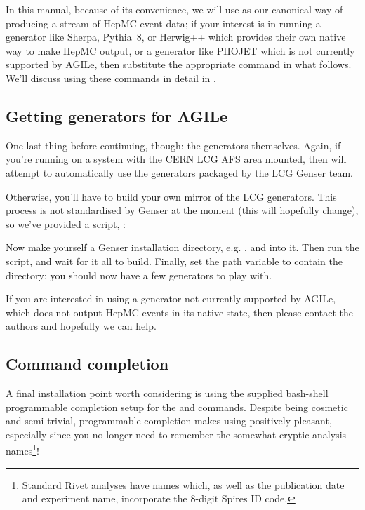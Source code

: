 \documentclass{JHEP3}
\begin{document}
In this manual, because of its convenience, we will use  as our
canonical way of producing a stream of HepMC event data; if your interest is in
running a generator like Sherpa\cite{Gleisberg:2008ta},
Pythia~8\cite{Sjostrand:2007gs,Sjostrand:2008vc}, or Herwig++\cite{Bahr:2008pv}
which provides their own native way to make HepMC output, or a generator like
PHOJET which is not currently supported by AGILe, then substitute the
appropriate command in what follows.  We'll discuss using these commands in
detail in .


\subsection{Getting generators for AGILe}
\label{sec:genser}

One last thing before continuing, though: the generators themselves. Again, if
you're running on a system with the CERN LCG AFS area mounted, then
 will attempt to automatically use the generators packaged by the
LCG Genser team.

Otherwise, you'll have to build your own mirror of the LCG generators. This
process is not standardised by Genser at the moment (this will hopefully
change), so we've provided a script, :\\

Now make yourself a Genser installation directory, e.g. ,
and  into it. Then run the  script, and wait
for it all to build. Finally, set the  path variable to
contain the  directory: you should now have a few
generators to play with.

If you are interested in using a generator not currently supported by AGILe,
which does not output HepMC events in its native state, then please contact the
authors and hopefully we can help.


\subsection{Command completion}

A final installation point worth considering is using the supplied bash-shell
programmable completion setup for the  and 
commands. Despite being cosmetic and semi-trivial, programmable completion makes
using  positively pleasant, especially since you no longer need to
remember the somewhat cryptic analysis names\footnote{Standard Rivet analyses
  have names which, as well as the publication date and experiment name,
  incorporate the 8-digit Spires ID code.}!
\end{document}
